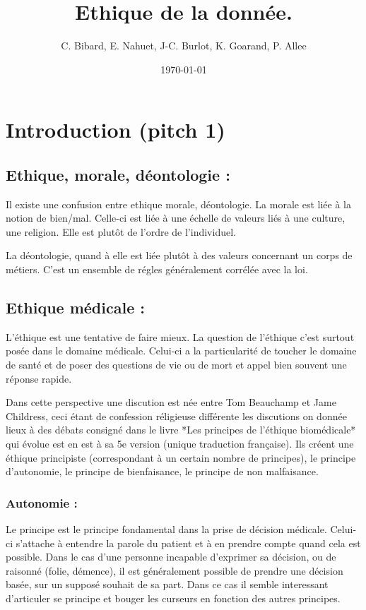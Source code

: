 \documentclass[a4paper,12pt]{article}
\title{Ethique de la donnée.}
\date{\today}
\author{C. Bibard, E. Nahuet, J-C. Burlot, K. Goarand, P. Allee}
\begin{document}
\maketitle
\tableofcontents





\section{Introduction (pitch 1)}


\subsection{Ethique, morale, déontologie : }

Il existe une confusion entre ethique morale, déontologie. La morale est liée à la notion de bien/mal. Celle-ci est liée à une échelle de valeurs liés à une culture, une religion. Elle est plutôt de l'ordre de l'individuel. 

La déontologie, quand à elle est liée plutôt à des valeurs concernant un corps de métiers. C'est un ensemble de régles généralement corrélée avec la loi. 

\subsection{Ethique médicale :}

L'éthique est une tentative de faire mieux. La question de l'éthique c'est surtout posée dans le domaine médicale. Celui-ci a la particularité de toucher le domaine de santé et de poser des questions de vie ou de mort et appel bien souvent une réponse rapide. 

Dans cette perspective une discution est née entre Tom Beauchamp et Jame Childress, ceci étant de confession réligieuse différente les discutions on donnée lieux à des débats consigné dans le livre *Les principes de l'éthique biomédicale* qui évolue est en est à sa 5e version (unique traduction française).
Ils créent une éthique principiste (correspondant à un certain nombre de principes), le principe d'autonomie, le principe de bienfaisance, le principe de non malfaisance.

\subsubsection{Autonomie : }

Le principe est le principe fondamental dans la prise de décision médicale. Celui-ci s'attache à entendre la parole du patient et à en prendre compte quand cela est possible. Dans le cas d'une personne incapable d'exprimer sa décision, ou de raisonné (folie, démence), il est généralement possible de prendre une décision basée, sur un supposé souhait de sa part. Dans ce cas il semble interessant d'articuler se principe et bouger les curseurs en fonction des autres principes. 
\end{document}
